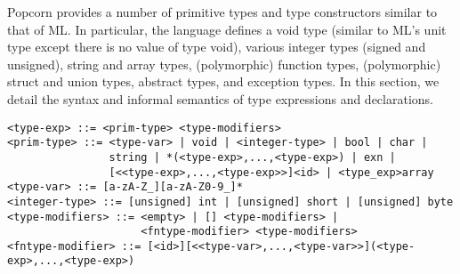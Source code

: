 \documentclass[titlepage,10pt]{article}
\begin{document}
Popcorn provides a number of primitive types and type constructors
similar to that of ML.  In particular, the language defines a void type
(similar to ML's unit type except there is no value of type void),
various integer types (signed and unsigned), string and array types,
(polymorphic) function types, (polymorphic) struct and union types,
abstract types, and exception types.  In this section, we detail the
syntax and informal semantics of type expressions and declarations.


\begin{verbatim}
<type-exp> ::= <prim-type> <type-modifiers>
<prim-type> ::= <type-var> | void | <integer-type> | bool | char | 
                string | *(<type-exp>,...,<type-exp>) | exn | 
                [<<type-exp>,...,<type-exp>>]<id> | <type_exp>array
<type-var> ::= [a-zA-Z_][a-zA-Z0-9_]*
<integer-type> ::= [unsigned] int | [unsigned] short | [unsigned] byte
<type-modifiers> ::= <empty> | [] <type-modifiers> |
                     <fntype-modifier> <type-modifiers>
<fntype-modifier> ::= [<id>][<<type-var>,...,<type-var>>](<type-exp>,...,<type-exp>)
\end{verbatim}
\end{document}
